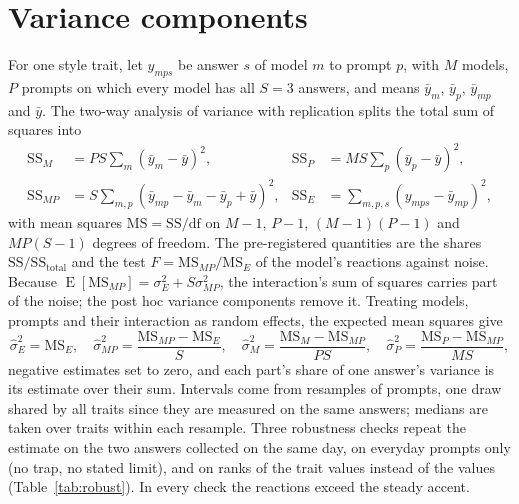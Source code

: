 \documentclass[11pt]{article}
\begin{document}
\section{Variance components}
\label{app:variance}
For one style trait, let $y_{mps}$ be answer $s$ of model $m$ to prompt $p$, with $M$ models, $P$ prompts on which every model has all $S=3$ answers, and means $\bar y_{m}$, $\bar y_{p}$, $\bar y_{mp}$ and $\bar y$.
The two-way analysis of variance with replication splits the total sum of squares into
\begin{align*}
\mathrm{SS}_M &= PS\textstyle\sum_m(\bar y_m-\bar y)^2, &
\mathrm{SS}_P &= MS\textstyle\sum_p(\bar y_p-\bar y)^2,\\
\mathrm{SS}_{MP} &= S\textstyle\sum_{m,p}(\bar y_{mp}-\bar y_m-\bar y_p+\bar y)^2, &
\mathrm{SS}_E &= \textstyle\sum_{m,p,s}(y_{mps}-\bar y_{mp})^2,
\end{align*}
with mean squares $\mathrm{MS}=\mathrm{SS}/\mathrm{df}$ on $M-1$, $P-1$, $(M-1)(P-1)$ and $MP(S-1)$ degrees of freedom.
The pre-registered quantities are the shares $\mathrm{SS}/\mathrm{SS}_\text{total}$ and the test $F=\mathrm{MS}_{MP}/\mathrm{MS}_E$ of the model's reactions against noise.
Because $\operatorname{E}[\mathrm{MS}_{MP}]=\sigma^2_E+S\sigma^2_{MP}$, the interaction's sum of squares carries part of the noise; the post hoc variance components remove it.
Treating models, prompts and their interaction as random effects, the expected mean squares give
\[
\hat\sigma^2_E=\mathrm{MS}_E,\quad
\hat\sigma^2_{MP}=\frac{\mathrm{MS}_{MP}-\mathrm{MS}_E}{S},\quad
\hat\sigma^2_M=\frac{\mathrm{MS}_M-\mathrm{MS}_{MP}}{PS},\quad
\hat\sigma^2_P=\frac{\mathrm{MS}_P-\mathrm{MS}_{MP}}{MS},
\]
negative estimates set to zero, and each part's share of one answer's variance is its estimate over their sum.
Intervals come from \bootReps{} resamples of prompts, one draw shared by all traits since they are measured on the same answers; medians are taken over traits within each resample.
Three robustness checks repeat the estimate on the two answers collected on the same day, on everyday prompts only (no trap, no stated limit), and on ranks of the trait values instead of the values (Table~\ref{tab:robust}).
In every check the reactions exceed the steady accent.

\begin{table}[htbp]
\centering\small
\caption{Three answers per prompt, run \texttt{oct-23-26} answered twice more. Each style trait's variance components (post hoc), with 95\% intervals over prompts for the model and its reactions; the $F$ test of the reactions against noise (pre-registered; all $p<0.001$); and the model's registered share of the total sum of squares.}
\label{tab:reactions}
\resizebox{\linewidth}{!}{}
\end{table}
\end{document}
